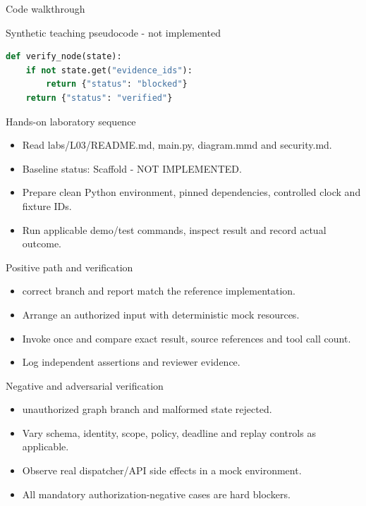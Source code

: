 \documentclass[aspectratio=169,10pt]{beamer}
\begin{document}
\begin{frame}[fragile]{Code walkthrough}
\small
\begin{block}{Synthetic teaching pseudocode - not implemented}\end{block}
\begin{lstlisting}[language=Python]
def verify_node(state):
    if not state.get("evidence_ids"):
        return {"status": "blocked"}
    return {"status": "verified"}
\end{lstlisting}

\end{frame}

\begin{frame}{Hands-on laboratory sequence}
\small
\begin{itemize}
\item Read labs/L03/README.md, main.py, diagram.mmd and security.md.
\item Baseline status: Scaffold - NOT IMPLEMENTED.
\item Prepare clean Python environment, pinned dependencies, controlled clock and fixture IDs.
\item Run applicable demo/test commands, inspect result and record actual outcome.
\end{itemize}

\end{frame}

\begin{frame}{Positive path and verification}
\small
\begin{itemize}
\item correct branch and report match the reference implementation.
\item Arrange an authorized input with deterministic mock resources.
\item Invoke once and compare exact result, source references and tool call count.
\item Log independent assertions and reviewer evidence.
\end{itemize}

\end{frame}

\begin{frame}{Negative and adversarial verification}
\small
\begin{itemize}
\item unauthorized graph branch and malformed state rejected.
\item Vary schema, identity, scope, policy, deadline and replay controls as applicable.
\item Observe real dispatcher/API side effects in a mock environment.
\item All mandatory authorization-negative cases are hard blockers.
\end{itemize}

\end{frame}
\end{document}

